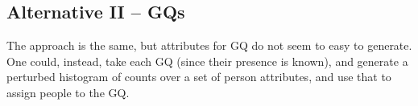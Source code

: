 \documentclass{amsart}
\begin{document}
{\subsection{Alternative II -- GQs}
The approach is the same, but attributes for GQ do not seem to easy to generate. One could, instead, take each GQ (since their presence is known), and generate a perturbed histogram of counts over a set of person attributes, and use that to assign people to the GQ. 


}
\end{document}
